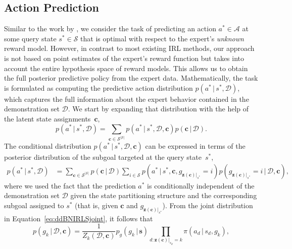 \documentclass[twoside,11pt]{article}
\newcommand{\p}{p}
\newcommand{\given}{\,\vert\,}
\newcommand{\softmax}{{\pi}}
\newcommand{\eqkomma}{,}
\newcommand{\eqpunkt}{.}
\begin{document}
\subsection{Action Prediction}
\label{sec:actionPrediction}
Similar to the work by \citet{abbeel2004apprenticeship}, we consider the task of predicting an action $a^*\in\mathcal{A}$ at some query state $s^*\in\mathcal{S}$ that is optimal with respect to the expert's \textit{unknown} reward model. However, %
in contrast to most existing IRL methods, %
%
our approach is not based on point estimates of the
expert's reward function but
%
%
takes into account the entire hypothesis space of %
reward models. %
This allows us to obtain the full posterior predictive policy from the expert data. %
%
Mathematically, %
the task %
is formulated as computing the predictive action distribution $\p(a^* \given s^*, \mathcal{D})$, which captures %
the full information about the expert behavior contained in the demonstration set $\mathcal{D}$. 
%
%
We start by expanding that distribution with the help of 
the latent state assignments~$\mathbf{c}$,
\begin{equation*}
	\p(a^* \given s^*,\mathcal{D}) = \sum_{\mathbf{c}\in\mathcal{S}^{|\mathcal{S}|}} \p(a^* \given s^*,\mathcal{D},\mathbf{c}) \p(\mathbf{c} \given \mathcal{D}) \eqpunkt
\end{equation*} 
The conditional distribution $\p(a^* \given s^*,\mathcal{D},\mathbf{c})$ %
%
can be expressed in terms of the %
posterior distribution of the subgoal targeted at the query state~$s^*$,
\begin{align*}
	\p(a^* \given s^*,\mathcal{D}) &= \sum_{\mathbf{c}\in\mathcal{S}^{|\mathcal{S}|}} \p(\mathbf{c} \given \mathcal{D}) \sum_{i\in\mathcal{S}}^{} \p(a^* \given s^*,\mathbf{c},g_{\mathbf{z}(\mathbf{c})\vert_{s^*}}=i) \p(g_{\mathbf{z}(\mathbf{c})\vert_{s^*}}=i \given \mathcal{D},\mathbf{c}) \eqkomma
\end{align*}
where we used the fact that the prediction $a^*$ is conditionally independent of the demonstration set $\mathcal{D}$ given the state partitioning structure and the corresponding subgoal assigned to $s^*$ (that is, given $\mathbf{c}$ and $g_{\mathbf{z}(\mathbf{c})\vert_{s^*}}$).
From the joint distribution in Equation~\eqref{eq:ddBNIRLSjoint}, it follows that
%
%
%
%
\begin{equation}
\p(g_k \given \mathcal{D},\mathbf{c}) = \frac{1}{Z_k(\mathcal{D},\mathbf{c})} \p_g(g_k \given \mathbf{s}) \!\!\! \prod_{d:\mathbf{z}(\mathbf{c})\vert_{s_d}=k} \!\!\! \softmax(a_d \given s_d,  g_k) \eqkomma %
\label{eq:subgoalPosterior}
\end{equation}
\end{document}
